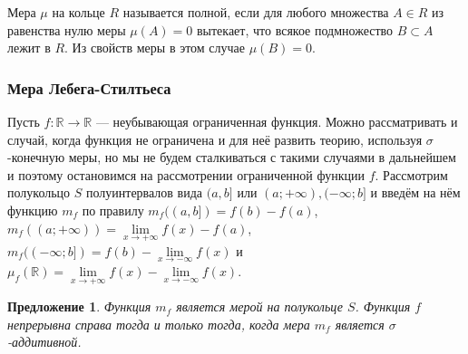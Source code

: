 \documentclass[12pt]{article}
\newtheorem{proposition}[theorem]{Предложение}
\numberwithin{theorem}{section}
\theoremstyle{definition}
\newcommand{\RR}{\mathbb{R}}
\newcommand{\defin}[2]{\hypertarget{#2}{{\color{red} #1}}}
\begin{document}
	Мера $ \mu $ на кольце $ R $ называется \defin{полной}{complete measure}, если для любого множества $ A \in R $ 
	из равенства нулю меры $ \mu(A) = 0 $ вытекает, что всякое подмножество $ B \subset A $ лежит в $ R $.
	Из свойств меры в этом случае $ \mu(B) = 0 $.
	
	\subsubsection{Мера Лебега-Стилтьеса}
	
	Пусть $ f \colon \RR \to \RR $ --- неубывающая ограниченная функция. Можно рассматривать и случай, когда функция не ограничена и для неё развить теорию, используя $ \sigma $-конечную меры, но мы не будем сталкиваться с такими случаями в дальнейшем и поэтому остановимся на рассмотрении ограниченной функции $ f $.
	Рассмотрим полукольцо $ S $ полуинтервалов вида $ (a, b] $ или $ (a; +\infty), (-\infty; b] $
	и введём на нём функцию $ m_f $ по правилу $ m_f((a, b]) = f(b) - f(a) $,
	$ m_f((a; +\infty)) = \lim\limits_{x \to +\infty} f(x) - f(a) $,
	$ m_f((-\infty; b]) = f(b) - \lim\limits_{x \to -\infty} f(x) $
	и $ \mu_f(\RR) = \lim\limits_{x \to +\infty} f(x) - \lim\limits_{x \to -\infty} f(x) $.
	
	\begin{proposition}
		Функция $ m_f $ является мерой на полукольце $ S $.
		Функция $ f $ непрерывна справа тогда и только тогда, когда мера $ m_f $ является $ \sigma $-аддитивной.
	\end{proposition}
	
\end{document}
